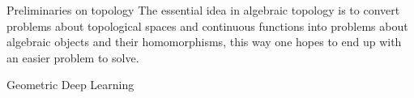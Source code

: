 \documentclass[12pt,a4paper]{report}
\theoremstyle{plain}
\theoremstyle{definition}
\theoremstyle{remark}
\begin{document}
    \begin{titlepage}
        
    \end{titlepage}
    \tableofcontents
    \newpage
    \begin{chapter}{Preliminaries on topology}
        \label{ch:1}
        The essential idea in algebraic topology is to convert problems about topological spaces and continuous functions into
        problems about algebraic objects and their homomorphisms, this way one hopes to end up with an easier problem to solve. 
        
    \end{chapter}
    \begin{chapter}{Geometric Deep Learning}
        
    \end{chapter}
    \newpage
\end{document}
